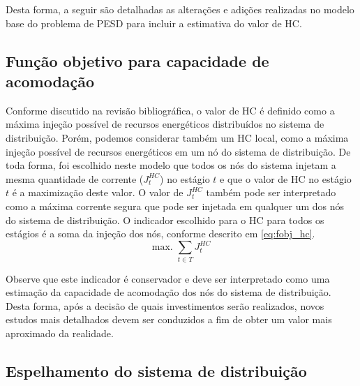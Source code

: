 Desta forma, a seguir são detalhadas as alterações e adições realizadas no modelo base do problema de \ac{PESD} para incluir a estimativa do valor de \ac{HC}.

\subsection{Função objetivo para capacidade de acomodação}

Conforme discutido na revisão bibliográfica, o valor de \ac{HC}  é definido como a máxima injeção possível de recursos energéticos distribuídos no sistema de distribuição. Porém, podemos considerar também um \ac{HC} local, como a máxima injeção possível de recursos energéticos em um nó do sistema de distribuição. De toda forma, foi escolhido neste modelo que todos os nós do sistema injetam a mesma quantidade de corrente ($J^{HC}_t$) no estágio $t$ e que o valor de \ac{HC} no estágio $t$ é a maximização deste valor. O valor de $J^{HC}_t$ também pode ser interpretado como a máxima corrente segura que pode ser injetada em qualquer um dos nós do sistema de distribuição. O indicador escolhido para o \ac{HC} para todos os estágios é a soma da injeção dos nós, conforme descrito em \eqref{eq:fobj_hc}. 
\begin{equation}
    \text{max.    } \sum_{t \in T} J^{HC}_t
    \label{eq:fobj_hc}
\end{equation}

Observe que este indicador é conservador  e deve ser interpretado como uma estimação da capacidade de acomodação dos nós do sistema de distribuição. Desta forma, após a decisão de quais investimentos serão realizados, novos estudos mais detalhados devem ser conduzidos a fim de obter um valor mais aproximado da realidade.


\subsection{Espelhamento do sistema de distribuição}

